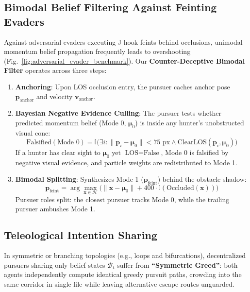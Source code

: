 \documentclass[conference]{IEEEtran}
\begin{document}
\subsection{Bimodal Belief Filtering Against Feinting Evaders}
Against adversarial evaders executing J-hook feints behind occlusions, unimodal momentum belief propagation frequently leads to overshooting (Fig.~\ref{fig:adversarial_evader_benchmark}). Our \textbf{Counter-Deceptive Bimodal Filter} operates across three steps:
\begin{enumerate}
    \item \textbf{Anchoring}: Upon LOS occlusion entry, the pursuer caches anchor pose $\mathbf{p}_{\text{anchor}}$ and velocity $\mathbf{v}_{\text{anchor}}$.
    \item \textbf{Bayesian Negative Evidence Culling}: The pursuer tests whether predicted momentum belief (Mode 0, $\boldsymbol{\mu}_0$) is inside any hunter's unobstructed visual cone:
    \begin{equation}
        \text{Falsified}(\text{Mode 0}) = \mathbb{I}\big( \exists i: \|\mathbf{p}_i - \boldsymbol{\mu}_0\| < 75\text{ px} \land \text{ClearLOS}(\mathbf{p}_i, \boldsymbol{\mu}_0) \big)
    \end{equation}
    If a hunter has clear sight to $\boldsymbol{\mu}_0$ yet $\text{LOS} = \text{False}$, Mode 0 is falsified by negative visual evidence, and particle weights are redistributed to Mode 1.
    \item \textbf{Bimodal Splitting}: Synthesizes Mode 1 ($\mathbf{p}_{\text{feint}}$) behind the obstacle shadow:
    \begin{equation}
        \mathbf{p}_{\text{feint}} = \arg\max_{\mathbf{x} \in \mathcal{H}} \big( \|\mathbf{x} - \boldsymbol{\mu}_0\| + 400 \cdot \mathbb{I}(\text{Occluded}(\mathbf{x})) \big)
    \end{equation}
    Pursuer roles split: the closest pursuer tracks Mode 0, while the trailing pursuer ambushes Mode 1.
\end{enumerate}

\subsection{Teleological Intention Sharing}
In symmetric or branching topologies (e.g., loops and bifurcations), decentralized pursuers sharing only belief states $\mathcal{B}_t$ suffer from \textbf{``Symmetric Greed''}: both agents independently compute identical greedy pursuit paths, crowding into the same corridor in single file while leaving alternative escape routes unguarded. 
\end{document}
